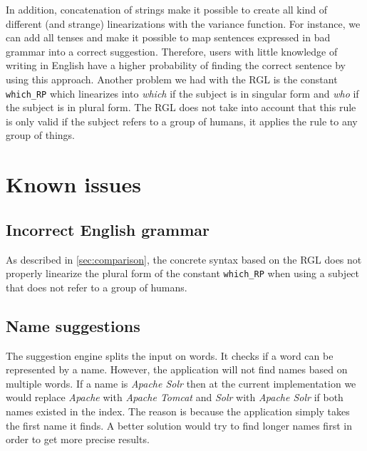 In addition, concatenation of strings make it possible to create all kind of different (and strange) linearizations with the variance function. For instance, we can add all tenses and make it possible to map sentences expressed in bad grammar into a correct suggestion. Therefore, users with little knowledge of writing in English have a higher probability of finding the correct sentence by using this approach.
\newline
\newline
Another problem we had with the RGL is the constant \texttt{which\_RP} which linearizes into \emph{which} if the subject is in singular form and \emph{who} if the subject is in plural form. The RGL does not take into account that this rule is only valid if the subject refers to a group of humans, it applies the rule to any group of things.

\section{Known issues}\label{sec:known-issues}

%
\subsection*{Incorrect English grammar}
As described in \autoref{sec:comparison}, the concrete syntax based on the RGL does not properly linearize the plural form of the constant \texttt{which\_RP} when using a subject that does not refer to a group of humans.

\subsection*{Name suggestions}
The suggestion engine splits the input on words. It checks if a word can be represented by a name. However, the application will not find names based on multiple words. If a name is \emph{Apache Solr} then at the current implementation we would replace \emph{Apache} with \emph{Apache Tomcat} and \emph{Solr} with \emph{Apache Solr} if both names existed in the index. The reason is because the application simply takes the first name it finds. A better solution would try to find longer names first in order to get more precise results.

